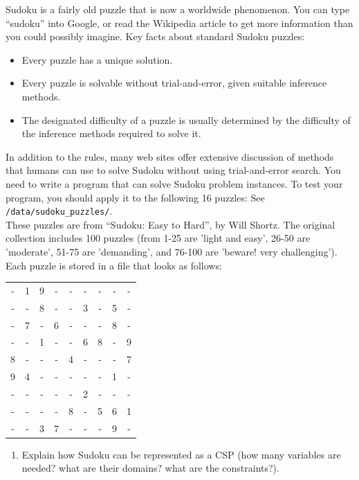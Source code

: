 \documentclass[12pt]{article}
\newenvironment{problem}[2][Problem]{\begin{trivlist}
\item[\hskip \labelsep {\bfseries #1}\hskip \labelsep {\bfseries #2.}]}{\end{trivlist}}
\begin{document}
\begin{problem}{2}
	Sudoku is a fairly old puzzle that is now a worldwide phenomenon.
	You can type ``sudoku'' into Google, or read the Wikipedia article to get more information than you could possibly imagine.
	Key facts about standard Sudoku puzzles:
	\begin{itemize}
		\item Every puzzle has a unique solution.
		\item Every puzzle is solvable without trial-and-error, given suitable inference methods.
		\item The designated difficulty of a puzzle is usually determined by the difficulty of the inference methods required to solve it.
	\end{itemize}
	In addition to the rules, many web sites offer extensive discussion of methods that humans can use to solve Sudoku without using trial-and-error search.
	You need to write a program that can solve Sudoku problem instances. To test your program, you should apply it to the following 16 puzzles:
	See \texttt{/data/sudoku\_puzzles/}. \\
	These puzzles are from ``Sudoku: Easy to Hard'', by Will Shortz.
	The original collection includes 100 puzzles (from 1-25 are 'light and easy', 26-50 are 'moderate', 51-75 are 'demanding', and 76-100 are 'beware! very challenging').
	Each puzzle is stored in a file that looks as follows: \\

	\begin{tabular}{ccccccccc}
		- & 1 & 9 & - & - & - & - & - & - \\
		- & - & 8 & - & - & 3 & - & 5 & - \\
		- & 7 & - & 6 & - & - & - & 8 & - \\
		- & - & 1 & - & - & 6 & 8 & - & 9 \\
		8 & - & - & - & 4 & - & - & - & 7 \\
		9 & 4 & - & - & - & - & - & 1 & - \\
		- & - & - & - & - & 2 & - & - & - \\
		- & - & - & - & 8 & - & 5 & 6 & 1 \\
		- & - & 3 & 7 & - & - & - & 9 & - \\
	\end{tabular}
	\begin{enumerate}
		\item Explain how Sudoku can be represented as a CSP (how many variables are needed? what are their domains? what are the constraints?). 


\end{enumerate}
\end{problem}
\end{document}
